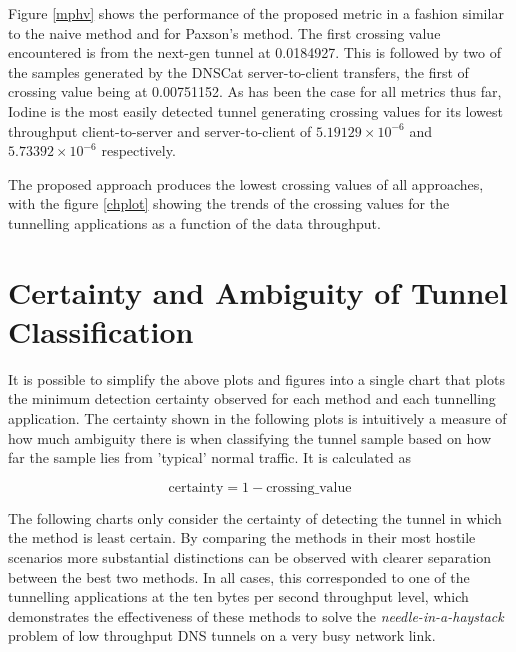 \documentclass[12pt]{report}
\theoremstyle{remark}
\theoremstyle{definition}
\theoremstyle{definition}
\theoremstyle{definition}
\begin{document}
Figure \ref{mphv} shows the performance of the proposed metric in a fashion
similar to the naive method and for Paxson's method. The first crossing value
encountered is from the next-gen tunnel at 0.0184927. This is followed by two of
the samples generated by the DNSCat server-to-client transfers, the first of
crossing value being at 0.00751152. As has been the case for all metrics thus
far, Iodine is the most easily detected tunnel generating crossing values for
its lowest throughput client-to-server and server-to-client of
$5.19129\times10^{-6}$ and $5.73392\times10^{-6}$ respectively.

The proposed approach produces the lowest crossing values of all approaches,
with the figure \ref{chplot} showing the trends of the crossing values for the
tunnelling applications as a function of the data throughput.

\section{Certainty and Ambiguity of Tunnel Classification}
\label{detection-perf-cert}

It is possible to simplify the above plots and figures into a single chart that
plots the minimum detection certainty observed for each method and each
tunnelling application. The certainty shown in the following plots is
intuitively a measure of how much ambiguity there is when classifying the tunnel
sample based on how far the sample lies from 'typical' normal traffic. It is
calculated as

\[\textrm{certainty}=1-\textrm{crossing\_value}\]

The following charts only consider the certainty of detecting the tunnel in
which the method is least certain. By comparing the methods in their most
hostile scenarios more substantial distinctions can be observed with clearer
separation between the best two methods. In all cases, this corresponded to one
of the tunnelling applications at the ten bytes per second throughput level,
which demonstrates the effectiveness of these methods to solve the
\emph{needle-in-a-haystack} problem of low throughput DNS tunnels on a very busy
network link.
\end{document}
